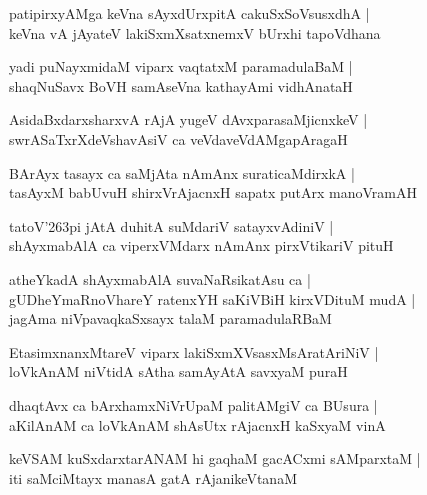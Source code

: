 \begin{shloka}
patipirxyAMga keVna sAyxdUrxpitA cakuSxSoVsusxdhA |\\
keVna vA jAyateV lakiSxmXsatxnemxV bUrxhi tapoVdhana
\end{shloka}

\begin{shloka}
yadi puNayxmidaM viparx vaqtatxM paramadulaBaM |\\
shaqNuSavx BoVH samAseVna kathayAmi vidhAnataH
\end{shloka}

\begin{shloka}
AsidaBxdarxsharxvA rAjA yugeV dAvxparasaMjicnxkeV |\\
swrASaTxrXdeVshavAsiV ca veVdaveVdAMgapAragaH
\end{shloka}

\begin{shloka}
BArAyx tasayx ca saMjAta nAmAnx suraticaMdirxkA |\\
tasAyxM babUvuH shirxVrAjacnxH sapatx putArx manoVramAH
\end{shloka}

\begin{shloka}
tatoV\char'263pi jAtA duhitA suMdariV satayxvAdiniV |\\
shAyxmabAlA ca viperxVMdarx nAmAnx pirxVtikariV pituH
\end{shloka}

\begin{shloka}
atheYkadA shAyxmabAlA suvaNaRsikatAsu ca |\\
gUDheYmaRnoVhareY ratenxYH saKiVBiH kirxVDituM mudA |\\
jagAma niVpavaqkaSxsayx talaM paramadulaRBaM
\end{shloka}

\begin{shloka}
EtasimxnanxMtareV viparx lakiSxmXVsasxMsAratAriNiV |\\
loVkAnAM niVtidA sAtha samAyAtA savxyaM puraH
\end{shloka}

\begin{shloka}
dhaqtAvx ca bArxhamxNiVrUpaM palitAMgiV ca BUsura |\\
aKilAnAM ca loVkAnAM shAsUtx rAjacnxH kaSxyaM vinA 
\end{shloka}

\begin{shloka}
keVSAM kuSxdarxtarANAM hi gaqhaM gacACxmi sAMparxtaM |\\
iti saMciMtayx manasA gatA rAjanikeVtanaM
\end{shloka}

